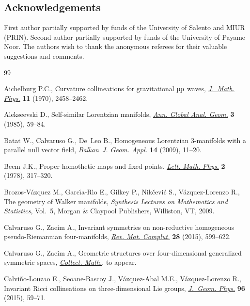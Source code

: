 \documentclass[pdftex]{sigma}
\numberwithin{equation}{section}
\begin{document}
\subsection*{Acknowledgements}

First author partially supported by funds of the University of Salento and MIUR (PRIN). Second author partially supported by funds of the University of Payame Noor. The authors wish to thank the anonymous referees for their valuable suggestions and comments.

\begin{thebibliography}{99}
\footnotesize\itemsep=-0.5pt

Aichelburg P.C., Curvature collineations for gravitational {${\rm pp}$} waves,
 \href{http://dx.doi.org/10.1063/1.1665410}{\textit{J.~Math. Phys.}} \textbf{11} (1970), 2458--2462.

Alekseevski D., Self-similar {L}orentzian manifolds, \href{http://dx.doi.org/10.1007/BF00054491}{\textit{Ann. Global Anal.
 Geom.}} \textbf{3} (1985), 59--84.

Batat W., Calvaruso G., De~Leo B., Homogeneous {L}orentzian 3-manifolds with a
 parallel null vector f\/ield, \textit{Balkan~J. Geom. Appl.} \textbf{14}
 (2009), 11--20.

Beem J.K., Proper homothetic maps and f\/ixed points, \href{http://dx.doi.org/10.1007/BF00419621}{\textit{Lett. Math. Phys.}}
 \textbf{2} (1978), 317--320.

Brozos-V{\'a}zquez M., Garc{\'{\i}}a-R{\'{\i}}o E., Gilkey P.,
 Nik{\v{c}}evi{\'c} S., V{\'a}zquez-Lorenzo R., The geometry of {W}alker
 manifolds, \textit{Synthesis Lectures on Mathematics and Statistics}, Vol.~5,
 Morgan \& Claypool Publishers, Williston, VT, 2009.

Calvaruso G., Zaeim A., Invariant symmetries on non-reductive homogeneous
 pseudo-{R}iemannian four-manifolds, \href{http://dx.doi.org/10.1007/s13163-015-0168-8}{\textit{Rev. Mat. Complut.}} \textbf{28}
 (2015), 599--622.

Calvaruso G., Zaeim A., Geometric structures over four-dimensional generalized
 symmetric spaces, \href{http://dx.doi.org/10.1007/s13348-016-0173-3}{\textit{Collect. Math.}}, {t}o appear.

Calvi{\~n}o-Louzao E., Seoane-Bascoy J., V{\'a}zquez-Abal M.E.,
 V{\'a}zquez-Lorenzo R., Invariant {R}icci collineations on three-dimensional
 {L}ie groups, \href{http://dx.doi.org/10.1016/j.geomphys.2015.06.005}{\textit{J.~Geom. Phys.}} \textbf{96} (2015), 59--71.


\end{thebibliography}
\end{document}

